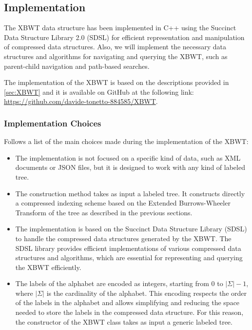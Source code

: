 \subsection{Implementation} \label{sec:xbwt_impl}



The XBWT data structure has been implemented in C++ using the Succinct Data Structure Library 2.0 (SDSL) for efficient representation and manipulation of compressed data structures. Also, we will implement the necessary data structures and algorithms for navigating and querying the XBWT, such as parent-child navigation and path-based searches. 

The implementation of the XBWT is based on the descriptions provided in \cref{sec:XBWT} and it is available on GitHub at the following link: \url{https://github.com/davide-tonetto-884585/XBWT}.

\subsubsection{Implementation Choices}
Follows a list of the main choices made during the implementation of the XBWT:
\begin{itemize}
    \item The implementation is not focused on a specific kind of data, such as XML documents or JSON files, but it is designed to work with any kind of labeled tree. 
    \item The construction method takes as input a labeled tree. It constructs directly a compressed indexing scheme based on the Extended Burrows-Wheeler Transform of the tree as described in the previous sections.
    \item The implementation is based on the Succinct Data Structure Library (SDSL) to handle the compressed data structures generated by the XBWT. The SDSL library provides efficient implementations of various compressed data structures and algorithms, which are essential for representing and querying the XBWT efficiently.
    \item The labels of the alphabet are encoded as integers, starting from 0 to $|\Sigma| - 1$, where $|\Sigma|$ is the cardinality of the alphabet. This encoding respects the order of the labels in the alphabet and allows simplifying and reducing the space needed to store the labels in the compressed data structure. For this reason, the constructor of the XBWT class takes as input a generic labeled tree.
\end{itemize}

